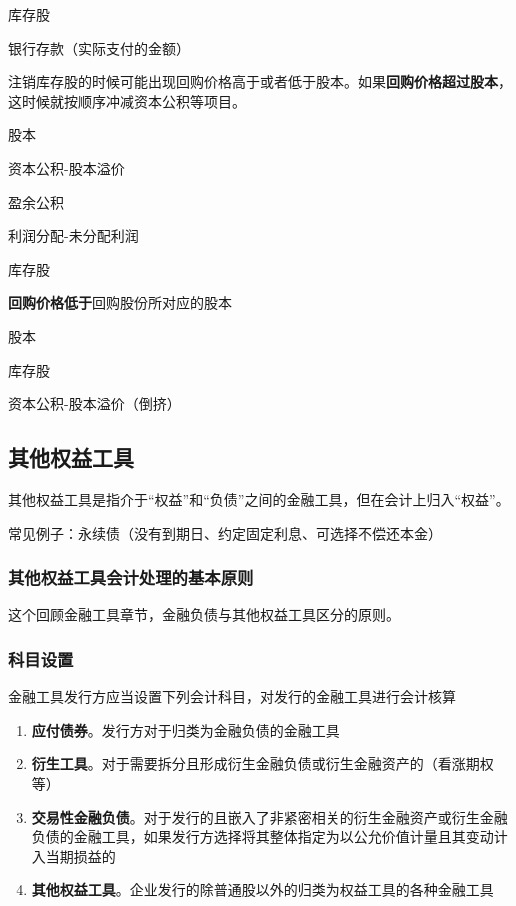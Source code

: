 \documentclass[UTF8,12pt]{ctexart}
\newenvironment{Dr}{%
	\begin{list}{}%
		{
			\setlength{\leftmargin}{2em}
			\setlength{\labelwidth}{2em}
			\setlength{\labelsep}{0pt}
			\setlength{\itemindent}{0pt}
			\setlength{\listparindent}{0pt}
			\setlength{\parsep}{0pt}
			\setlength{\topsep}{0pt}
		}
		\item[\textbf{借：}]
	}{%
	\end{list}
}
\newenvironment{Cr}{%
	\begin{list}{}%
		{
			\setlength{\leftmargin}{3em}
			\setlength{\labelwidth}{2em}
			\setlength{\labelsep}{0pt}
			\setlength{\itemindent}{0pt}
			\setlength{\listparindent}{0pt}
			\setlength{\parsep}{0pt}
			\setlength{\topsep}{0pt}
		}
		\item[\textbf{贷：}]
	}{%
	\end{list}
}
\numberwithin{equation}{section} %
\numberwithin{figure}{section}
\numberwithin{table}{section}
\begin{document}
	\begin{Dr}
		库存股
	\end{Dr}
	\begin{Cr}
		银行存款（实际支付的金额）
	\end{Cr}
	
	
	注销库存股的时候可能出现回购价格高于或者低于股本。如果\textbf{回购价格超过股本}，这时候就按顺序冲减资本公积等项目。
	
	\begin{Dr}
		股本
		
		资本公积-股本溢价
		
		盈余公积
		
		利润分配-未分配利润
	\end{Dr}
	\begin{Cr}
		库存股
	\end{Cr}

	\textbf{回购价格低于}回购股份所对应的股本
	
	\begin{Dr}
		股本
	\end{Dr}
	\begin{Cr}
		库存股
		
		资本公积-股本溢价（倒挤）
	\end{Cr}
	
	\subsection{其他权益工具}
	其他权益工具是指介于“权益”和“负债”之间的金融工具，但在会计上归入“权益”。
	
	常见例子：永续债（没有到期日、约定固定利息、可选择不偿还本金）
	
	\subsubsection{其他权益工具会计处理的基本原则}
	这个回顾金融工具章节，金融负债与其他权益工具区分的原则。
	
	\subsubsection{科目设置}
	金融工具发行方应当设置下列会计科目，对发行的金融工具进行会计核算
	\begin{enumerate}
		\item \textbf{应付债券}。发行方对于归类为金融负债的金融工具
		
		\item \textbf{衍生工具}。对于需要拆分且形成衍生金融负债或衍生金融资产的（看涨期权等）
		
		\item \textbf{交易性金融负债}。对于发行的且嵌入了非紧密相关的衍生金融资产或衍生金融负债的金融工具，如果发行方选择将其整体指定为以公允价值计量且其变动计入当期损益的
		
		\item \textbf{其他权益工具}。企业发行的除普通股以外的归类为权益工具的各种金融工具
	\end{enumerate}
	
\end{document}
